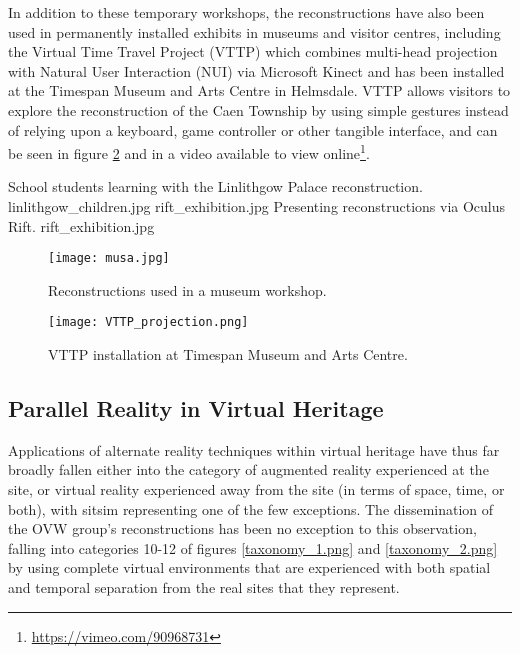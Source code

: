 In addition to these temporary workshops, the reconstructions have also been used in permanently installed exhibits in museums and visitor centres, including the Virtual Time Travel Project (VTTP) which combines multi-head projection with Natural User Interaction (NUI) via Microsoft Kinect and has been installed at the Timespan Museum and Arts Centre in Helmsdale. VTTP allows visitors to explore the reconstruction of the Caen Township by using simple gestures instead of relying upon a keyboard, game controller or other tangible interface, and can be seen in figure \ref{VTTP_projection.png} and in a video available to view online\footnote{\url{https://vimeo.com/90968731}}.

 {School students learning with the Linlithgow Palace reconstruction.} {linlithgow_children.jpg}
       {rift_exhibition.jpg} {Presenting reconstructions via Oculus Rift.} {rift_exhibition.jpg}

\begin{figure}[h]
\centering
  \texttt{[image: musa.jpg]}
  \caption{Reconstructions used in a museum workshop.}
  \label{musa.jpg}
\end{figure}

\begin{figure}[h]
\centering
  \texttt{[image: VTTP\_projection.png]}
  \caption{VTTP installation at Timespan Museum and Arts Centre.}
  \label{VTTP_projection.png}
\end{figure}


\subsection{Parallel Reality in Virtual Heritage}

\label{parallel-reality-in-virtual-heritage}


Applications of alternate reality techniques within virtual heritage have thus far broadly fallen either into the category of augmented reality experienced at the site, or virtual reality experienced away from the site (in terms of space, time, or both), with sitsim representing one of the few exceptions. The dissemination of the OVW group's reconstructions has been no exception to this observation, falling into categories 10-12 of figures \ref{taxonomy_1.png} and \ref{taxonomy_2.png} by using complete virtual environments that are experienced with both spatial and temporal separation from the real sites that they represent.

